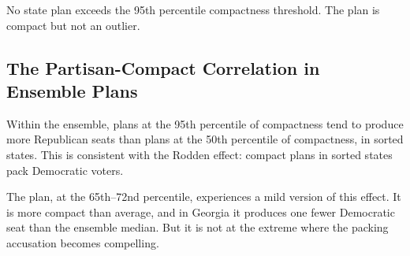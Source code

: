 No \ar{} state plan exceeds the 95th percentile compactness threshold.
The plan is compact but not an outlier.

\subsection{The Partisan-Compact Correlation in Ensemble Plans}

Within the \recom{} ensemble, plans at the 95th percentile of compactness
tend to produce more Republican seats than plans at the 50th percentile of
compactness, in sorted states.  This is consistent with the Rodden effect:
compact plans in sorted states pack Democratic voters.

The \ar{} plan, at the 65th--72nd percentile, experiences a mild version
of this effect.  It is more compact than average, and in Georgia it produces
one fewer Democratic seat than the ensemble median.  But it is not at the
extreme where the packing accusation becomes compelling.
